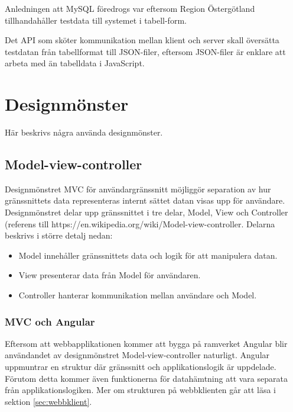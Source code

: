 \documentclass[a4paper,10pt]{article}
\begin{document}
Anledningen att MySQL föredrogs var eftersom Region Östergötland tillhandahåller testdata till systemet i tabell-form.

Det API som sköter kommunikation mellan klient och server skall översätta testdatan från tabellformat till JSON-filer, eftersom JSON-filer är enklare att arbeta med än tabelldata i JavaScript.

\section{Designmönster}
Här beskrivs några använda designmönster.

\subsection{Model-view-controller}
Designmönstret MVC för användargränssnitt möjliggör separation av hur gränssnittets data representeras internt sättet datan visas upp för användare. Designmönstret delar upp gränssnittet i tre delar, Model, View och Controller (referens till https://en.wikipedia.org/wiki/Model-view-controller. Delarna beskrivs i större detalj nedan:
\begin{itemize}
  \item Model innehåller gränssnittets data och logik för att manipulera datan.
  \item View presenterar data från Model för användaren.
  \item Controller hanterar kommunikation mellan användare och Model.
\end{itemize}

\subsubsection{MVC och Angular}

Eftersom att webbapplikationen kommer att bygga på ramverket Angular blir användandet av designmönstret Model-view-controller naturligt. Angular uppmuntrar en struktur där gränssnitt och applikationslogik är uppdelade. Förutom detta kommer även funktionerna för datahämtning att vara separata från applikationslogiken. Mer om strukturen på webbklienten går att läsa i sektion \ref{sec:webbklient}.

\clearpage
\end{document}
